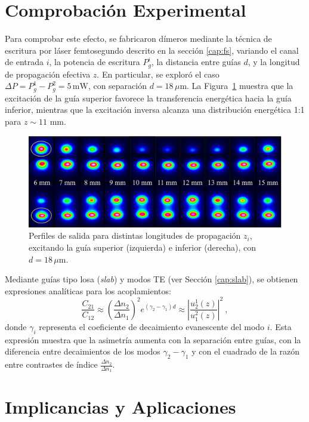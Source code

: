 \section{Comprobación Experimental}
Para comprobar este efecto, se fabricaron dímeros mediante la técnica de escritura por láser femtosegundo descrito en la sección \ref{cap:fs}, variando el canal de entrada \( i \), la potencia de escritura \( P_{g}^i \), la distancia entre guías \( d \), y la longitud de propagación efectiva \( z \). En particular, se exploró el caso \( \Delta P = P_g^1 - P_g^2 = 5\,\mathrm{mW} \), con separación \( d = 18\,\mu\mathrm{m} \). La Figura~\ref{fig:nosymexp} muestra que la excitación de la guía superior favorece la transferencia energética hacia la guía inferior, mientras que la excitación inversa alcanza una distribución energética 1:1 para $z\sim 11$ mm.
\begin{figure}[H]
	\centering
	\includegraphics[width=0.7\linewidth]{media/nonsymm-exp.png}
	\caption[Perfiles de salida para distintas longitudes de propagación.]{Perfiles de salida para distintas longitudes de propagación \( z_i \), excitando la guía superior (izquierda) e inferior (derecha), con \( d = 18\,\mu\mathrm{m} \). \label{fig:nosymexp}}
\end{figure} \vspace{-4ex} Mediante guías tipo losa (\textit{slab}) y modos TE (ver Sección \ref{cap:slab}), se obtienen expresiones analíticas para los acoplamientos:
\begin{equation*}
	\frac{C_{21}}{C_{12}} \approx \left( \frac{\Delta n_2}{\Delta n_1} \right)^2 e^{(\gamma_2 - \gamma_1) d}\approx \left|\frac{u_2^1(z)}{u_1^2(z)}\right|^2 \ ,
\end{equation*}
donde \( \gamma_i \) representa el coeficiente de decaimiento evanescente del modo \( i \). Esta expresión muestra que la asimetría aumenta con la separación entre guías, con la diferencia entre decaimientos de los modos $\gamma_2 - \gamma_1$ y con el cuadrado de la razón entre contrastes de índice $\frac{\Delta n_2}{\Delta n_1}$. 

\section{Implicancias y Aplicaciones}


